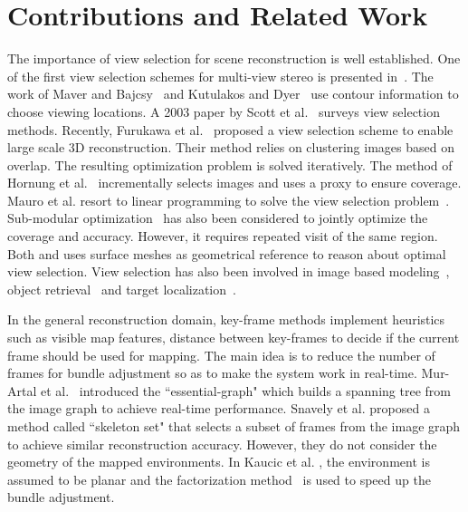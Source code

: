 \section{Contributions and Related Work}
The importance of view selection for scene reconstruction is well
established.  One of the first view selection schemes for multi-view
stereo is presented in~\cite{farid1994view}.  The work of Maver and
Bajcsy~\cite{maver1993occlusions} and Kutulakos and Dyer~\cite{kutulakos1994recovering} use
contour information to choose viewing locations. 
A 2003 paper by Scott et al.~\cite{scott2003view} surveys
view selection methods.  Recently, Furukawa et
al.~\cite{furukawa2010towards} proposed a view selection scheme to
enable large scale 3D reconstruction.  Their method relies on
clustering images based on overlap. The resulting optimization problem
is solved iteratively.  The method of Hornung et
al.~\cite{hornung2008image} incrementally selects images and uses a
proxy to ensure coverage.  Mauro et al. resort to linear programming
to solve the view selection problem~\cite{mauro2014integer}. Sub-modular optimization~\cite{krause2014submodular}
has also been considered to jointly optimize the coverage and accuracy. 
However, it requires repeated visit of the same region. Both \cite{krause2014submodular} and \cite{hoppe2012photogrammetric}
uses surface meshes as geometrical reference to reason about optimal view selection. 
View selection has also been involved in image based modeling~\cite{vazquez2003automatic}, object
retrieval~\cite{gao2011less} and target
localization~\cite{isler2008sensor}. 

In the general reconstruction domain, key-frame methods \cite{klein2007parallel} \cite{murORB2} \cite{engel2014lsd} implement heuristics such as visible map features, distance between key-frames to decide if the current frame should be used for mapping. The main idea is to reduce the number of frames for bundle adjustment so as to make the system work in real-time. Mur-Artal et al.~\cite{murORB2} introduced the ``essential-graph" which builds a spanning tree from the image graph to achieve real-time performance. 
Snavely et al. \cite{snavely2008skeletal} proposed a method called ``skeleton set" that selects a subset of frames from the image graph to achieve similar reconstruction accuracy. However, they do not consider the geometry of the mapped environments. In Kaucic et al. \cite{planeBasedRecon}, the environment is assumed to be planar and the factorization method~\cite{sturm1996factorization} is used to speed up the bundle adjustment. 

